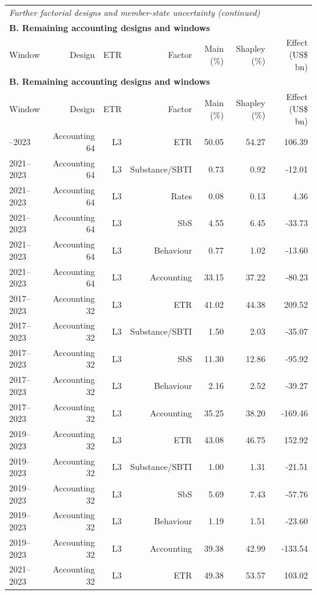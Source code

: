 {\addtocounter{table}{-1}
\begin{longtable}{@{}lrrrrrr@{}}
\multicolumn{7}{l}{\textit{Further factorial designs and member-state uncertainty (continued)}} \\
\multicolumn{7}{l}{\textbf{B. Remaining accounting designs and windows}} \\
\toprule
Window & Design & ETR & Factor & Main (\%) & Shapley (\%) & Effect (US\$ bn) \\
\midrule
\endfirsthead
\multicolumn{7}{l}{\textbf{B. Remaining accounting designs and windows}} \\
\toprule
Window & Design & ETR & Factor & Main (\%) & Shapley (\%) & Effect (US\$ bn) \\
\midrule
\endhead
\midrule
\endfoot
\bottomrule
\endlastfoot
2021–2023 & Accounting 64 & L3 & ETR & 50.05 & 54.27 &  106.39 \\
2021–2023 & Accounting 64 & L3 & Substance/SBTI &  0.73 &  0.92 &  -12.01 \\
2021–2023 & Accounting 64 & L3 & Rates &  0.08 &  0.13 &    4.36 \\
2021–2023 & Accounting 64 & L3 & SbS &  4.55 &  6.45 &  -33.73 \\
2021–2023 & Accounting 64 & L3 & Behaviour &  0.77 &  1.02 &  -13.60 \\
2021–2023 & Accounting 64 & L3 & Accounting & 33.15 & 37.22 &  -80.23 \\
2017–2023 & Accounting 32 & L3 & ETR & 41.02 & 44.38 &  209.52 \\
2017–2023 & Accounting 32 & L3 & Substance/SBTI &  1.50 &  2.03 &  -35.07 \\
2017–2023 & Accounting 32 & L3 & SbS & 11.30 & 12.86 &  -95.92 \\
2017–2023 & Accounting 32 & L3 & Behaviour &  2.16 &  2.52 &  -39.27 \\
2017–2023 & Accounting 32 & L3 & Accounting & 35.25 & 38.20 & -169.46 \\
2019–2023 & Accounting 32 & L3 & ETR & 43.08 & 46.75 &  152.92 \\
2019–2023 & Accounting 32 & L3 & Substance/SBTI &  1.00 &  1.31 &  -21.51 \\
2019–2023 & Accounting 32 & L3 & SbS &  5.69 &  7.43 &  -57.76 \\
2019–2023 & Accounting 32 & L3 & Behaviour &  1.19 &  1.51 &  -23.60 \\
2019–2023 & Accounting 32 & L3 & Accounting & 39.38 & 42.99 & -133.54 \\
2021–2023 & Accounting 32 & L3 & ETR & 49.38 & 53.57 &  103.02 \\

\end{longtable}}
